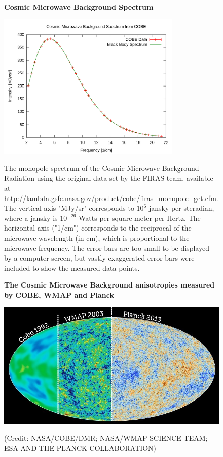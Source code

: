 \documentclass{article}
\begin{document}
\begin{figure}[h]
\centering
    \textbf{Cosmic Microwave Background  Spectrum}\par\medskip
\centering
   {\includegraphics[height=7cm]{blackbody}}
\caption{The monopole spectrum of the Cosmic Microwave Background Radiation using the original data set by the FIRAS team, available at \url{http://lambda.gsfc.nasa.gov/product/cobe/firas_monopole_get.cfm}. The vertical axis "MJy/sr" corresponds to $10^6$ jansky per steradian, where a jansky is $10^{-26}$ Watts per square-meter per Hertz. The horizontal axis ("1/cm") corresponds to the reciprocal of the microwave wavelength (in cm), which is proportional to the microwave frequency. The error bars are too small to be displayed by a computer screen, but vastly exaggerated error bars were included to show the measured data points.}
\label{cobe_blackbody}
\end{figure}


\begin{figure}[h]
\centering
    \textbf{The Cosmic Microwave Background anisotropies measured by COBE, WMAP and Planck}\par\medskip
\centering
   {\includegraphics[width=.65\textwidth]{cmb1.jpg}}


\caption{(Credit: NASA/COBE/DMR; NASA/WMAP SCIENCE TEAM; ESA AND THE PLANCK COLLABORATION)}
\label{cobe_wmap_planck}
\end{figure}
\end{document}
